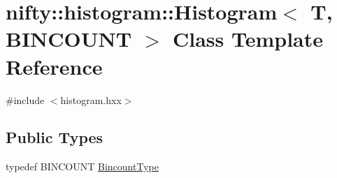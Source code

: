 \hypertarget{classnifty_1_1histogram_1_1Histogram}{}\section{nifty\+:\+:histogram\+:\+:Histogram$<$ T, B\+I\+N\+C\+O\+U\+NT $>$ Class Template Reference}
\label{classnifty_1_1histogram_1_1Histogram}


{\ttfamily \#include $<$histogram.\+hxx$>$}

\subsection*{Public Types}
\begin{DoxyCompactItemize}
\item 
typedef B\+I\+N\+C\+O\+U\+NT \hyperlink{classnifty_1_1histogram_1_1Histogram_a19ad5e06bce1f70819a7ac9cdb708cf3}{Bincount\+Type}
\end{DoxyCompactItemize}
